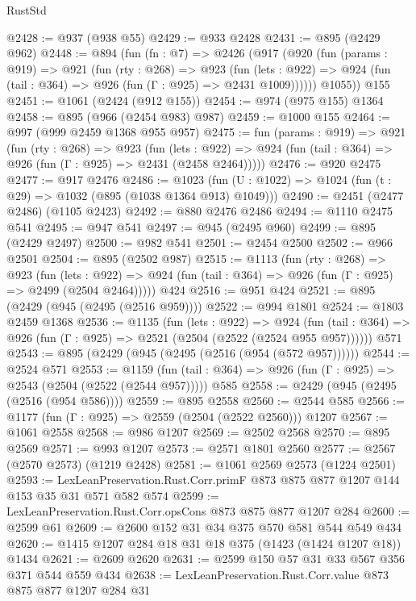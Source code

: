 \begin{lexlean}{RustStd}
\begin{coremodule}
@2428 := @937 (@938 @55)
@2429 := @933 @2428
@2431 := @895 (@2429 @962)
@2448 := @894
    (fun (fn : @7) =>
    @2426
      (@917
        (@920
          (fun (params : @919) =>
          @921
            (fun (rty : @268) =>
            @923
              (fun (lets : @922) =>
              @924 (fun (tail : @364) => @926 (fun (Γ : @925) => @2431 @1009))))))
        @1055))
    @155
@2451 := @1061 (@2424 (@912 @155))
@2454 := @974 (@975 @155) @1364
@2458 := @895 (@966 (@2454 @983) @987)
@2459 := @1000 @155
@2464 := @997 (@999 @2459 @1368 @955 @957)
@2475 := fun (params : @919) =>
  @921
    (fun (rty : @268) =>
    @923
      (fun (lets : @922) =>
      @924 (fun (tail : @364) => @926 (fun (Γ : @925) => @2431 (@2458 @2464)))))
@2476 := @920 @2475
@2477 := @917 @2476
@2486 := @1023 (fun (U : @1022) => @1024 (fun (t : @29) => @1032 (@895 (@1038 @1364 @913) @1049)))
@2490 := @2451 (@2477 @2486) (@1105 @2423)
@2492 := @880 @2476 @2486
@2494 := @1110 @2475 @541
@2495 := @947 @541
@2497 := @945 (@2495 @960)
@2499 := @895 (@2429 @2497)
@2500 := @982 @541
@2501 := @2454 @2500
@2502 := @966 @2501
@2504 := @895 (@2502 @987)
@2515 := @1113
    (fun (rty : @268) =>
    @923
      (fun (lets : @922) =>
      @924 (fun (tail : @364) => @926 (fun (Γ : @925) => @2499 (@2504 @2464)))))
    @424
@2516 := @951 @424
@2521 := @895 (@2429 (@945 (@2495 (@2516 @959))))
@2522 := @994 @1801
@2524 := @1803 @2459 @1368
@2536 := @1135
    (fun (lets : @922) =>
    @924 (fun (tail : @364) => @926 (fun (Γ : @925) => @2521 (@2504 (@2522 (@2524 @955 @957))))))
    @571
@2543 := @895 (@2429 (@945 (@2495 (@2516 (@954 (@572 @957))))))
@2544 := @2524 @571
@2553 := @1159
    (fun (tail : @364) => @926 (fun (Γ : @925) => @2543 (@2504 (@2522 (@2544 @957)))))
    @585
@2558 := @2429 (@945 (@2495 (@2516 (@954 @586))))
@2559 := @895 @2558
@2560 := @2544 @585
@2566 := @1177 (fun (Γ : @925) => @2559 (@2504 (@2522 @2560))) @1207
@2567 := @1061 @2558
@2568 := @986 @1207
@2569 := @2502 @2568
@2570 := @895 @2569
@2571 := @993 @1207
@2573 := @2571 @1801 @2560
@2577 := @2567 (@2570 @2573) (@1219 @2428)
@2581 := @1061 @2569 @2573 (@1224 @2501)
@2593 := LexLeanPreservation.Rust.Corr.primF @873 @875 @877 @1207 @144 @153 @35 @31 @571 @582 @574
@2599 := LexLeanPreservation.Rust.Corr.opsCons @873 @875 @877 @1207 @284
@2600 := @2599 @61
@2609 := @2600 @152 @31 @34 @375 @570 @581 @544 @549 @434
@2620 := @1415 @1207 @284 @18 @31 @18 @375 (@1423 (@1424 @1207 @18)) @1434
@2621 := @2609 @2620
@2631 := @2599 @150 @57 @31 @33 @567 @356 @371 @544 @559 @434
@2638 := LexLeanPreservation.Rust.Corr.value @873 @875 @877 @1207 @284 @31

\end{coremodule}
\end{lexlean}
